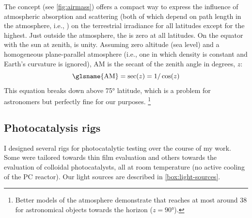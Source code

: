 \documentclass[webedition,openright,titles,swedish,english]{LuaUUThesis}\usepackage[]{graphicx}\usepackage[]{xcolor}
\newcommand{\ie}{i.e.}
\newcommand{\seemore}[1]{\marginnote{%
   \noindent\tikz[baseline=(current bounding box.south)]%
   \node[text width=0.8\marginparwidth,align=left,rectangle,rounded corners,fill=blondsvag,font=\scriptsize]{#1};%
}}
\begin{document}
The  concept (see \cref{fig:airmass}) offers a compact way to express
the influence of atmospheric absorption and scattering (both of which depend on
path length in the atmosphere, \ie, ) on the terrestrial irradiance
for all latitudes except for the highest.
Just outside the atmosphere, the  is zero at all latitudes.
On the equator with the sun at zenith,  is unity.
Assuming zero altitude (sea level) and a homogeneous plane-parallel atmosphere
(\ie, one in which density is constant and Earth's curvature is ignored),
\seemore{\cref{photoec}}
\gls{AM} is the secant of the zenith angle in degrees, $z$:
\begin{equation}\label{eq:airmass}
\mathrm{\glsname{AM}} = \sec(z) = 1/\cos(z)
\end{equation}
This equation breaks down above \ang{75} latitude, which is a problem
for astronomers but perfectly fine for our purposes.%
\footnote{%
   Better models of the atmosphere \cite{Woolard1966} demonstrate that
    reaches at most around \num{38} for astronomical objects
   towards the horizon ($z=\ang{90}$).
}




\subsection{Photocatalysis rigs}
\label{pc:rigs}

I designed several rigs for photocatalytic testing over the course of my work.
Some were tailored towards thin film evaluation and others towards the
evaluation of colloidal photocatalysts, all at room temperature
(no active cooling of the \gls{PC} reactor).
Our light sources are described in \cref{box:light-sources}.

%
\end{document}
